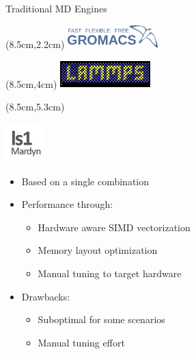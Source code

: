 \documentclass[
	10pt,
	t		%
]{beamer}
\begin{document}
\begin{frame}{Traditional MD Engines}


    \begin{textblock*}{3.5cm}(8.5cm,2.2cm)
        \includegraphics[width=3.5cm]{figures/gromacs-logo.png}
    \end{textblock*}
    \begin{textblock*}{3.5cm}(8.5cm,4cm)
        \includegraphics[width=3.5cm]{figures/lammps-logo.png}
    \end{textblock*}
    \begin{textblock*}{3cm}(8.5cm,5.3cm)
        \begin{center}

            \includegraphics[width=1.5cm]{figures/ls1-logo.png}
        \end{center}
    \end{textblock*}


    \begin{itemize}
        \item Based on a single combination
        \item Performance through:
              \begin{itemize}
                  \item Hardware aware SIMD vectorization
                  \item Memory layout optimization
                  \item Manual tuning to target hardware
              \end{itemize}
        \item Drawbacks:
              \begin{itemize}
                  \item Suboptimal for some scenarios
                  \item Manual tuning effort
              \end{itemize}
    \end{itemize}

\end{frame}
\end{document}
